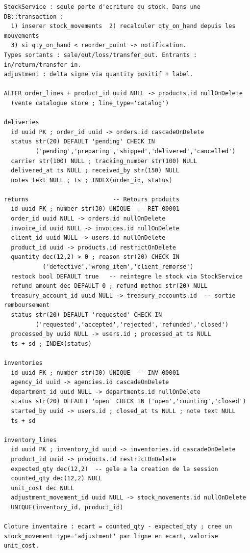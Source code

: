 \documentclass[11pt,a4paper]{article}
\begin{document}
\begin{lstlisting}
StockService : seule porte d'ecriture du stock. Dans une DB::transaction :
  1) inserer stock_movements  2) recalculer qty_on_hand depuis les mouvements
  3) si qty_on_hand < reorder_point -> notification.
Types sortants : sale/out/loss/transfer_out. Entrants : in/return/transfer_in.
adjustment : delta signe via quantity positif + label.

ALTER order_lines + product_id uuid NULL -> products.id nullOnDelete
  (vente catalogue store ; line_type='catalog')

deliveries
  id uuid PK ; order_id uuid -> orders.id cascadeOnDelete
  status str(20) DEFAULT 'pending' CHECK IN
         ('pending','preparing','shipped','delivered','cancelled')
  carrier str(100) NULL ; tracking_number str(100) NULL
  delivered_at ts NULL ; received_by str(150) NULL
  notes text NULL ; ts ; INDEX(order_id, status)

returns                        -- Retours produits
  id uuid PK ; number str(30) UNIQUE  -- RET-00001
  order_id uuid NULL -> orders.id nullOnDelete
  invoice_id uuid NULL -> invoices.id nullOnDelete
  client_id uuid NULL -> users.id nullOnDelete
  product_id uuid -> products.id restrictOnDelete
  quantity dec(12,2) > 0 ; reason str(20) CHECK IN
           ('defective','wrong_item','client_remorse')
  restock bool DEFAULT true   -- reintegre le stock via StockService
  refund_amount dec DEFAULT 0 ; refund_method str(20) NULL
  treasury_account_id uuid NULL -> treasury_accounts.id  -- sortie remboursement
  status str(20) DEFAULT 'requested' CHECK IN
         ('requested','accepted','rejected','refunded','closed')
  processed_by uuid NULL -> users.id ; processed_at ts NULL
  ts + sd ; INDEX(status)

inventories
  id uuid PK ; number str(30) UNIQUE  -- INV-00001
  agency_id uuid -> agencies.id cascadeOnDelete
  department_id uuid NULL -> departments.id nullOnDelete
  status str(20) DEFAULT 'open' CHECK IN ('open','counting','closed')
  started_by uuid -> users.id ; closed_at ts NULL ; note text NULL
  ts + sd

inventory_lines
  id uuid PK ; inventory_id uuid -> inventories.id cascadeOnDelete
  product_id uuid -> products.id restrictOnDelete
  expected_qty dec(12,2)  -- gele a la creation de la session
  counted_qty dec(12,2) NULL
  unit_cost dec NULL
  adjustment_movement_id uuid NULL -> stock_movements.id nullOnDelete
  UNIQUE(inventory_id, product_id)

Cloture inventaire : ecart = counted_qty - expected_qty ; cree un
stock_movement type='adjustment' par ligne en ecart, valorise unit_cost.
\end{lstlisting}
\end{document}
